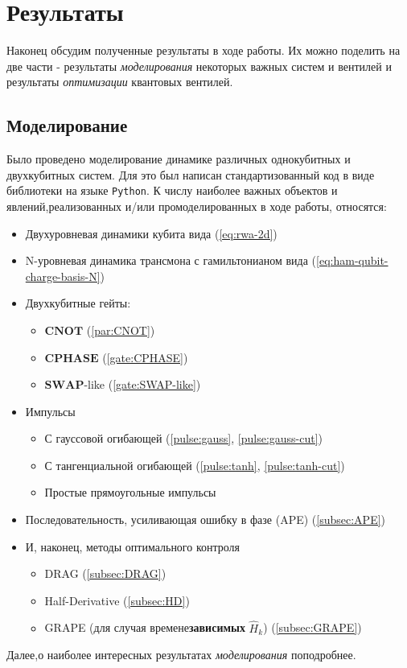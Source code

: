 \documentclass[12pt, twoside]{report}
\numberwithin{equation}{section}
\numberwithin{figure}{section}
\begin{document}
\chapter{Результаты}
Наконец обсудим полученные результаты в ходе работы. Их можно поделить на две части - результаты \textit{моделирования} некоторых важных систем и вентилей и результаты \textit{оптимизации} квантовых вентилей.
\section{Моделирование}
Было проведено моделирование динамике различных однокубитных и двухкубитных систем. Для это был написан стандартизованный код в виде библиотеки на языке \texttt{Python}. К числу наиболее важных объектов и явлений,реализованных и/или промоделированных в ходе работы, относятся:
\begin{itemize}
	\item Двухуровневая динамики кубита вида (\ref{eq:rwa-2d})
	\item N-уровневая динамика трансмона с гамильтонианом вида (\ref{eq:ham-qubit-charge-basis-N})
	\item Двухкубитные гейты:
	\begin{itemize}
		\item $\mathbf{CNOT}$ (\ref{par:CNOT})
		\item $\mathbf{CPHASE}$ (\ref{gate:CPHASE})
		\item $\mathbf{SWAP}$-like (\ref{gate:SWAP-like})
	\end{itemize}
	\item Импульсы 
	\begin{itemize}
		\item С гауссовой огибающей (\ref{pulse:gauss}, \ref{pulse:gauss-cut})
		\item С тангенциальной огибающей (\ref{pulse:tanh}, \ref{pulse:tanh-cut}) 
		\item Простые прямоугольные импульсы
	\end{itemize}	  
	\item Последовательность, усиливающая ошибку в фазе (APE) (\ref{subsec:APE})
	\item И, наконец, методы оптимального контроля 
	\begin{itemize}
		\item DRAG (\ref{subsec:DRAG})
		\item Half-Derivative (\ref{subsec:HD})
		\item GRAPE (для случая времене\textbf{зависимых} $\hat{H}_{k}$) (\ref{subsec:GRAPE})
	\end{itemize}  
\end{itemize}
Далее,о наиболее интересных результатах \textit{моделирования} поподробнее.
\end{document}
